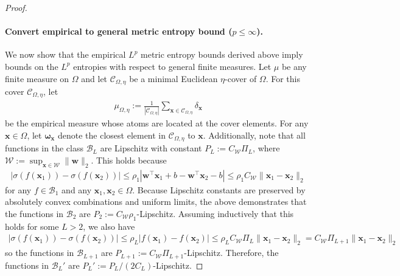 \documentclass{article}
\def\vomega{{\bm{\omega}}}
\def\vw{{\bm{w}}}
\def\vx{{\bm{x}}}
\def\cB{{\mathcal{B}}}
\def\cC{{\mathcal{C}}}
\def\cW{{\mathcal{W}}}
\begin{document}
\begin{appendices}
\begin{proof}
    \paragraph{Convert empirical to general metric entropy bound ($p \leq \infty$).} We now show that the empirical $L^p$ metric entropy bounds derived above imply bounds on the $L^p$ entropies with respect to general finite measures. Let $\mu$ be any finite measure on $\Omega$ and let $\cC_{\Omega,\eta}$ be a minimal Euclidean $\eta$-cover of $\Omega$. For this cover $\cC_{\Omega,\eta}$, let
    \begin{align}
        \mu_{\Omega, \eta} := \frac{1}{|\cC_{\Omega,\eta}|} \sum_{\vx \in \cC_{\Omega,\eta}} \delta_{\vx}
    \end{align}
    be the empirical measure whose atoms are located at the cover elements. For any $\vx \in \Omega$, let $\vomega_{\vx}$ denote the closest element in $\cC_{\Omega,\eta}$ to $\vx$. Additionally, note that all functions in the class $\cB_L$ are Lipschitz with constant $P_L := C_{\cW} \Pi_L$, where $\cW := \sup_{\vx \in \cW} \| \vw \|_2$. This holds because
    \begin{align}
        |\sigma(f(\vx_1)) - \sigma(f(\vx_2))| \leq \rho_1 |\vw^\top \vx_1 + b - \vw^\top \vx_2 - b | \leq \rho_1 C_{\cW} \| \vx_1 - \vx_2 \|_2 
    \end{align}
    for any $f \in \cB_1$ and any $\vx_1, \vx_2 \in \Omega$. Because Lipschitz constants are preserved by absolutely convex combinations and uniform limits, the above demonstrates that the functions in $\cB_2$ are $P_2 := C_{\cW} \rho_1$-Lipschitz. Assuming inductively that this holds for some $L > 2$, we also have
    \begin{align}
        |\sigma(f(\vx_1)) - \sigma(f(\vx_2))| \leq \rho_L |f(\vx_1) - f(\vx_2)| \leq \rho_L  C_{\cW} \Pi_L \| \vx_1 - \vx_2 \|_2 = C_{\cW} \Pi_{L+1} \| \vx_1 - \vx_2 \|_2
    \end{align}
    so the functions in $\cB_{L+1}$ are $P_{L+1} := C_{\cW} \Pi_{L+1}$-Lipschitz. Therefore, the functions in $\cB_L'$ are $P_L' := P_L/(2 C_L)$-Lipschitz.
    

\end{proof}
\end{appendices}
\end{document}
